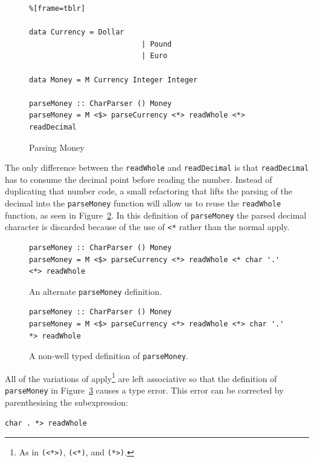 \begin{figure}[t]
 \begin{lstlisting}%[frame=tblr]

data Currency = Dollar
                          | Pound
                          | Euro
              
data Money = M Currency Integer Integer

parseMoney :: CharParser () Money
parseMoney = M <$> parseCurrency <*> readWhole <*> readDecimal
 \end{lstlisting}
 \caption{Parsing Money}
 \label{parseMoney}
 \end{figure}
 
The only difference between the \texttt{readWhole} and \texttt{readDecimal} is that \texttt{readDecimal} has to consume the decimal point before reading the number. Instead of duplicating that number code, a small refactoring that lifts the parsing of the decimal into the \texttt{parseMoney} function will allow us to reuse the \texttt{readWhole} function, as seen in Figure~\ref{altParseMoney}. In this definition of \texttt{parseMoney} the parsed decimal character is discarded because of the use of \texttt{<*} rather than the normal apply.

\begin{figure}[t]
 \begin{lstlisting}
parseMoney :: CharParser () Money
parseMoney = M <$> parseCurrency <*> readWhole <* char '.' <*> readWhole
 \end{lstlisting}
 \caption{An alternate \texttt{parseMoney} definition.}
 \label{altParseMoney}
\end{figure}

 
 \begin{figure}[t] 
  \begin{lstlisting}
parseMoney :: CharParser () Money
parseMoney = M <$> parseCurrency <*> readWhole <*> char '.' *> readWhole
 \end{lstlisting}
 \caption{A non-well typed definition of \texttt{parseMoney}.}
 \label{typeParseErr}
 \end{figure}
 
All of the variations of apply\footnote{As in \texttt{(<*>)}, \texttt{(<*)}, and \texttt{(*>)}.} are left associative so that the definition of \texttt{parseMoney} in Figure~\ref{typeParseErr} causes a type error. This error can be corrected by parenthesising the subexpression:

\begin{center}
	 \texttt{char \textquotesingle.\textquotesingle~*> readWhole}
\end{center}
 
